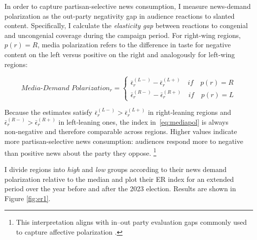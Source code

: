 \documentclass[12pt]{article}
\begin{document}
	
In order to capture partisan-selective news consumption, I measure  news-demand polarization as the out-party negativity gap in audience reactions to slanted content. Specifically, I calculate the \emph{elasticity gap} between reactions to congenial and uncongenial coverage during the campaign period. For right-wing regions, $p(r)=R$, media polarization refers to the difference in taste for negative content on the left versus positive on the right and analogously for left-wing regions:
	
	
	\begin{equation}
		\textit{Media-Demand Polarization}_r  =	\begin{cases}
			\bar{\epsilon}_r^{(L-)}- \bar{\epsilon}_r^{(L+)} \quad if \quad p(r)=R\\
			\bar{\epsilon}_r^{(R-)}- \bar{\epsilon}_r^{(R+)} \quad if \quad p(r)=L
		\end{cases}
		\label{eq:mediapol}
	\end{equation}
	
	
	
	Because the estimates satisfy
	\(\bar{\epsilon}_r^{(L-)}>\bar{\epsilon}_r^{(L+)}\) in right‑leaning regions and
	\(\bar{\epsilon}_r^{(R-)}>\bar{\epsilon}_r^{(R+)}\) in left‑leaning ones,
	the index in~\eqref{eq:mediapol} is always non‑negative and therefore comparable across regions. Higher values indicate more partisan-selective news consumption: audiences 	 respond more to negative than positive news about the party they oppose. \footnote{This interpretation aligns with in–out party evaluation gaps commonly used to capture affective polarization \citep{IyengarLelkesLevendusky2019Origins}.}
	
	
	I divide regions into \textit{high} and \textit{low} groups according to their news demand polarization  relative to the median and plot their ER index for an extended period over the year before and after the 2023 election.  Results are shown in Figure \ref{fig:er1}.
	
	
	
\end{document}

